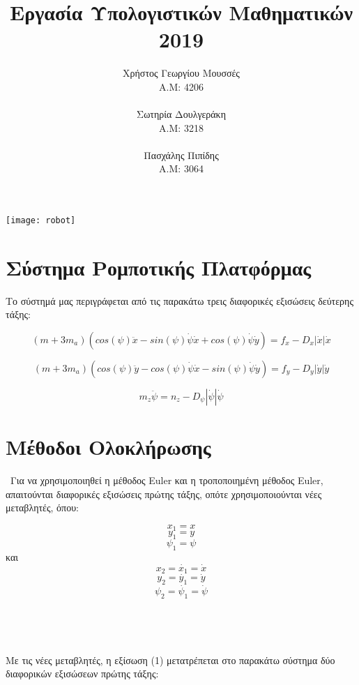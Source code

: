 \documentclass{article}
\begin{document}
 
\title{Εργασία Υπολογιστικών Μαθηματικών 2019}
\author{
Χρήστος Γεωργίου Μουσσές\\A.M: 4206\\\\
Σωτηρία Δουλγεράκη\\A.M: 3218\\\\
Πασχάλης Πιπίδης\\A.M: 3064
}
\date{}

\maketitle
\texttt{[image: robot]}

\newpage
\tableofcontents
\newpage


\section{Σύστημα Ρομποτικής Πλατφόρμας}

Το σύστημά μας περιγράφεται από τις παρακάτω τρεις διαφορικές εξισώσεις δεύτερης τάξης: 

\begin{equation}
(m + 3m_a)(cos(\psi)\ddot{x} - sin(\psi)\dot{\psi}\dot{x} + cos(\psi)\dot{\psi}\dot{y}) = f_x - D_x|\dot{x}|\dot{x}
\end{equation}

\begin{equation}
(m + 3m_a)(cos(\psi)\ddot{y} - cos(\psi)\dot{\psi}\dot{x} - sin(\psi)\dot{\psi}\dot{y}) = f_y - D_y|\dot{y}|\dot{y}
\end{equation}

\begin{equation}
m_z\ddot{\psi} = n_z - D_\psi|\dot{\psi}|\dot{\psi}
\end{equation}

\section{Μέθοδοι Ολοκλήρωσης}\
Για να χρησιμοποιηθεί η μέθοδος Euler και η τροποποιημένη μέθοδος Euler, απαιτούνται διαφορικές εξισώσεις πρώτης τάξης, οπότε χρησιμοποιούνται νέες μεταβλητές, όπου:

\[
x_1 = x
\]
\[
y_1 = y
\]
\[
\psi_1 = \psi
\]
και
\[
x_2 = \dot{x_1} = \dot{x} 
\]
\[
y_2 = \dot{y_1} = \dot{y} 
\]
\[
\psi_2 = \dot{\psi_1} = \dot{\psi} 
\]
\\\\\\\\
Με τις νέες μεταβλητές, η εξίσωση (1) μετατρέπεται στο παρακάτω σύστημα δύο διαφορικών εξισώσεων πρώτης τάξης:
\end{document}
